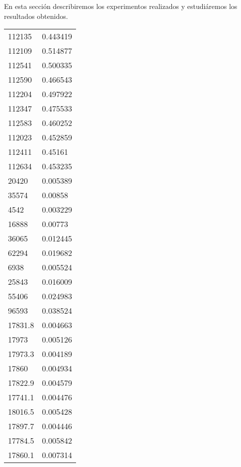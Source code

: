 \documentclass[11pt,a4paper]{article}
\begin{document}
	En esta sección describiremos los experimentos realizados y estudiáremos los resultados obtenidos. 
	
	
	
	\begin{table}[]
		\begin{tabular}{ll}
			112135  & 0.443419 \\
			112109  & 0.514877 \\
			112541  & 0.500335 \\
			112590  & 0.466543 \\
			112204  & 0.497922 \\
			112347  & 0.475533 \\
			112583  & 0.460252 \\
			112023  & 0.452859 \\
			112411  & 0.45161  \\
			112634  & 0.453235 \\
			20420   & 0.005389 \\
			35574   & 0.00858  \\
			4542    & 0.003229 \\
			16888   & 0.00773  \\
			36065   & 0.012445 \\
			62294   & 0.019682 \\
			6938    & 0.005524 \\
			25843   & 0.016009 \\
			55406   & 0.024983 \\
			96593   & 0.038524 \\
			17831.8 & 0.004663 \\
			17973   & 0.005126 \\
			17973.3 & 0.004189 \\
			17860   & 0.004934 \\
			17822.9 & 0.004579 \\
			17741.1 & 0.004476 \\
			18016.5 & 0.005428 \\
			17897.7 & 0.004446 \\
			17784.5 & 0.005842 \\
			17860.1 & 0.007314
		\end{tabular}
	\end{table}
	

\iffalse 	
	\begin{figure}[H] 
		\centering
		\texttt{[image: capturas/prueba1.png]} 
		\caption{Bomba de prueba - gdb} \label{fig:figura25}
	\end{figure}
\fi
	
\end{document}
